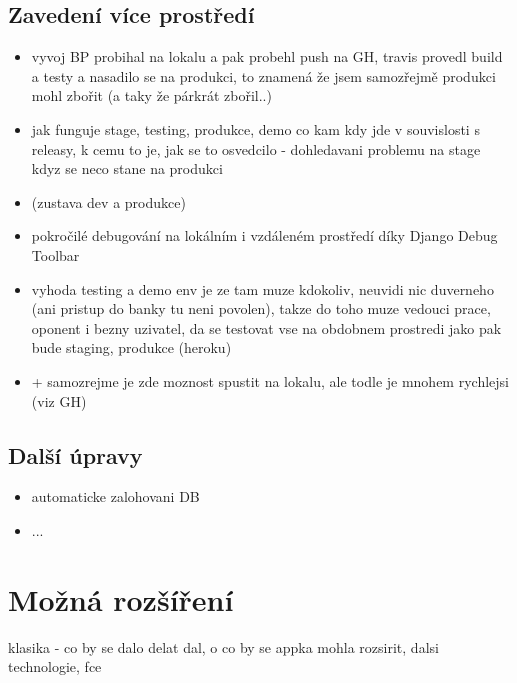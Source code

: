 \section{Zavedení více prostředí}
\begin{itemize}
\item vyvoj BP probihal na lokalu a pak probehl push na GH, travis provedl build a testy a nasadilo se na produkci, to znamená že jsem samozřejmě produkci mohl zbořit (a taky že párkrát zbořil..)
\item jak funguje stage, testing, produkce, demo co kam kdy jde v souvislosti s releasy, k cemu to je, jak se to osvedcilo - dohledavani problemu na stage kdyz se neco stane na produkci
\item (zustava dev a produkce)
\item pokročilé debugování na lokálním i vzdáleném prostředí díky Django Debug Toolbar 
\item vyhoda testing a demo env je ze tam muze kdokoliv, neuvidi nic duverneho (ani pristup do banky tu neni povolen), takze do toho muze vedouci prace, oponent i bezny uzivatel, da se testovat vse na obdobnem prostredi jako pak bude staging, produkce (heroku)
\item + samozrejme je zde moznost spustit na lokalu, ale todle je mnohem rychlejsi (viz GH)
\end{itemize}

\section{Další úpravy}
\begin{itemize}
\item automaticke zalohovani DB
\item ...
\end{itemize}



\chapter{Možná rozšíření}
klasika - co by se dalo delat dal, o co by se appka mohla rozsirit, dalsi technologie, fce

